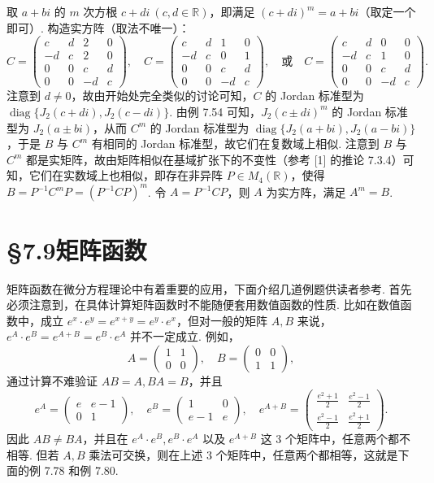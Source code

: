 \documentclass[UTF8, 12pt, fontset=fandol, oneside]{ctexart}
\begin{document}
取 $a+bi$ 的 $m$ 次方根 $c+di\ (c,d\in\mathbb{R})$，即满足 $(c+di)^m=a+bi$（取定一个即可）. 构造实方阵（取法不唯一）：
\[
C=\left(\begin{array}{rrrr}
c&d&2&0\\
-d&c&2&0\\
0&0&c&d\\
0&0&-d&c
\end{array}\right),
\quad
C=\left(\begin{array}{rrrr}
c&d&1&0\\
-d&c&0&1\\
0&0&c&d\\
0&0&-d&c
\end{array}\right),
\quad \text{或}\quad
C=\left(\begin{array}{rrrr}
c&d&0&0\\
-d&c&1&0\\
0&0&c&d\\
0&0&-d&c
\end{array}\right).
\]
注意到 $d\ne0$，故由开始处完全类似的讨论可知，$C$ 的 Jordan 标准型为 $\operatorname{diag}\{J_2(c+di),J_2(c-di)\}$. 由例 7.54 可知，$J_2(c\pm di)^m$ 的 Jordan 标准型为 $J_2(a\pm bi)$，从而 $C^m$ 的 Jordan 标准型为 $\operatorname{diag}\{J_2(a+bi),J_2(a-bi)\}$，于是 $B$ 与 $C^m$ 有相同的 Jordan 标准型，故它们在复数域上相似. 注意到 $B$ 与 $C^m$ 都是实矩阵，故由矩阵相似在基域扩张下的不变性（参考 [1] 的推论 7.3.4）可知，它们在实数域上也相似，即存在非异阵 $P\in M_4(\mathbb{R})$，使得 $B=P^{-1}C^mP=(P^{-1}CP)^m$. 令 $A=P^{-1}CP$，则 $A$ 为实方阵，满足 $A^m=B$.

\section*{§7.9\quad 矩阵函数}

矩阵函数在微分方程理论中有着重要的应用，下面介绍几道例题供读者参考. 首先必须注意到，在具体计算矩阵函数时不能随便套用数值函数的性质. 比如在数值函数中，成立 $e^x\cdot e^y=e^{x+y}=e^y\cdot e^x$，但对一般的矩阵 $A,B$ 来说，$e^A\cdot e^B=e^{A+B}=e^B\cdot e^A$ 并不一定成立. 例如，
\[
A=\left(\begin{array}{cc}1&1\\0&0\end{array}\right),\quad
B=\left(\begin{array}{cc}0&0\\1&1\end{array}\right),
\]
通过计算不难验证 $AB=A,BA=B$，并且
\[
e^A=\left(\begin{array}{cc}e&e-1\\0&1\end{array}\right),\quad
e^B=\left(\begin{array}{cc}1&0\\e-1&e\end{array}\right),\quad
e^{A+B}=\left(\begin{array}{cc}\frac{e^2+1}{2}&\frac{e^2-1}{2}\\[2pt]\frac{e^2-1}{2}&\frac{e^2+1}{2}\end{array}\right).
\]
因此 $AB\ne BA$，并且在 $e^A\cdot e^B,e^B\cdot e^A$ 以及 $e^{A+B}$ 这 3 个矩阵中，任意两个都不相等. 但若 $A,B$ 乘法可交换，则在上述 3 个矩阵中，任意两个都相等，这就是下面的例 7.78 和例 7.80.
\end{document}
